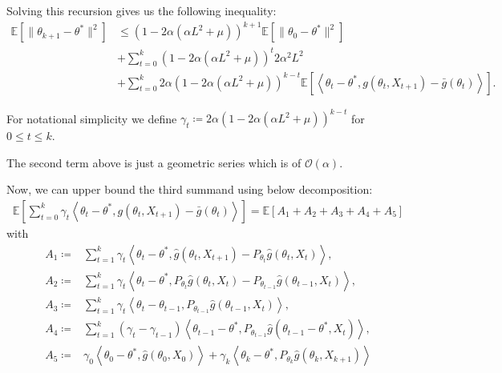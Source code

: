 \documentclass[a4paper]{article}
\newcommand{\norm}[1]{\|#1 \|}
\newcommand{\Exs}{\mathbb{E}}
\newcommand{\thetastar}{\theta^*}
\newcommand{\stepsize}{\alpha}
\begin{document}
Solving this recursion gives us the following inequality:
\begin{align*}
	\Exs\left[\norm{\theta_{k + 1} - \thetastar}^{2}\right] & \le \left(1 - 2\stepsize\left(\stepsize L^{2} + \mu\right)\right)^{k + 1}\Exs\left[\norm{\theta_{0} - \thetastar}^{2}\right] \\
	& + \sum_{t = 0}^{k}\left(1 - 2\stepsize\left(\stepsize L^{2} + \mu\right)\right)^{t}2\stepsize^{2}L^{2} \\
	& + \sum_{t = 0}^{k}2\stepsize\left(1 - 2\stepsize\left(\stepsize L^{2} + \mu\right)\right)^{k - t}\Exs\left[\left\langle \theta_{t} - \thetastar, g\left(\theta_{t}, X_{t + 1}\right) - \bar{g}\left(\theta_{t}\right) \right\rangle\right].
\end{align*}

For notational simplicity we define $\gamma_{t} \coloneq 2\stepsize\left(1 - 2\stepsize\left(\stepsize L^{2} + \mu\right)\right)^{k - t}$ for $0 \le t \le k$.

The second term above is just a geometric series which is of $\mathcal{O}\left(\stepsize\right)$.

Now, we can upper bound the third summand using below decomposition:
\begin{align*}
	\Exs\left[ \sum_{t = 0}^{k} \gamma_{t}\left\langle \theta_{t} - \thetastar, g(\theta_{t}, X_{t + 1}) - \bar{g}(\theta_{t}) \right\rangle \right] = \Exs\left[ A_{1} + A_{2} + A_{3} + A_{4} + A_{5}\right]
\end{align*}
with
\begin{align*}
	A_{1} \coloneq & \sum_{t = 1}^{k}\gamma_{t}\left\langle \theta_{t} - \thetastar, \hat{g}\left(\theta_{t}, X_{t + 1}\right) - P_{\theta_{t}}\hat{g}\left(\theta_{t}, X_{t}\right) \right\rangle,\\
	A_{2} \coloneq & \sum_{t = 1}^{k}\gamma_{t}\left\langle \theta_{t} - \thetastar, P_{\theta_{t}}\hat{g}\left(\theta_{t}, X_{t}\right) - P_{\theta_{t - 1}}\hat{g}\left( \theta_{t - 1}, X_{t} \right) \right\rangle,\\
	A_{3} \coloneq & \sum_{t = 1}^{k}\gamma_{t}\left\langle \theta_{t} - \theta_{t - 1}, P_{\theta_{t - 1}}\hat{g}\left( \theta_{t - 1}, X_{t}\right) \right\rangle,\\
	A_{4} \coloneq & \sum_{t = 1}^{k}\left(\gamma_{t} - \gamma_{t - 1}\right)\left\langle \theta_{t - 1} - \thetastar, P_{\theta_{t - 1}}\hat{g}\left( \theta_{t - 1} - \thetastar, X_{t}\right) \right\rangle,\\
	A_{5} \coloneq & \gamma_{0}\left\langle \theta_{0} - \thetastar, \hat{g}\left(\theta_{0}, X_{0}\right) \right\rangle + \gamma_{k}\left\langle \theta_{k} - \thetastar, P_{\theta_{k}}\hat{g}\left(\theta_{k}, X_{k + 1}\right)\right\rangle
\end{align*}
\end{document}
